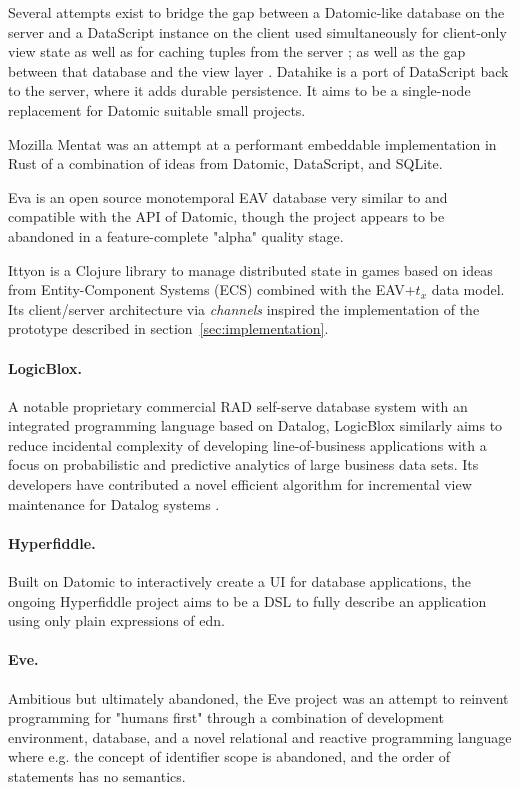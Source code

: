 Several attempts exist to bridge the gap between a Datomic-like database on the server and a DataScript instance on the client used simultaneously for client-only view state as well as for caching tuples from the server \cite{small16datscript}; as well as the gap between that database and the view layer \cite{parker15posh,krivosheev19reposh}. Datahike \cite{datahike} is a port of DataScript back to the server, where it adds durable persistence. It aims to be a single-node replacement for Datomic suitable small projects.

Mozilla Mentat \cite{mozillamentat} was an attempt at a performant embeddable implementation in Rust of a combination of ideas from Datomic, DataScript, and SQLite.

Eva \cite{eva} is an open source monotemporal EAV database very similar to and compatible with the \gls{API} of Datomic, though the project appears to be abandoned in a feature-complete "alpha" quality stage.

Ittyon \cite{ittyon} is a Clojure library to manage distributed state in games based on ideas from Entity-Component Systems (ECS) combined with the EAV+$t_x$ data model. Its client/server architecture via \emph{channels} inspired the implementation of the prototype described in section~\ref{sec:implementation}.

\paragraph{LogicBlox.} A notable proprietary commercial RAD self-serve database system with an integrated programming language based on Datalog, LogicBlox \cite{aref2015design} similarly aims to reduce incidental complexity of developing line-of-business applications with a focus on probabilistic and predictive analytics of large business data sets. Its developers have contributed a novel efficient algorithm for incremental view maintenance for Datalog systems \cite{veldhuizen2012leapfrog}.


\paragraph{Hyperfiddle.} Built on Datomic to interactively create a \gls{UI} for database applications, the ongoing Hyperfiddle project \cite{getz18hyperfiddle} aims to be a \gls{DSL} to fully describe an application using only plain expressions of \gls{edn}.


\paragraph{Eve.} Ambitious but ultimately abandoned, the Eve project \cite{eve} was an attempt to reinvent programming for "humans first" through a combination of development environment, database, and a novel relational and reactive programming language where e.g. the concept of identifier scope is abandoned, and the order of statements has no semantics.
